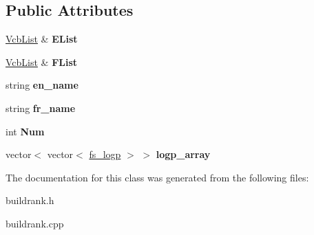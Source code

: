 \subsection*{\-Public \-Attributes}
\begin{DoxyCompactItemize}
\item 
\hypertarget{classbuildrank_ad13e26f7f5f7b4ed1b164c2c08921403}{\hyperlink{classVcbList}{\-Vcb\-List} \& {\bfseries \-E\-List}}\label{classbuildrank_ad13e26f7f5f7b4ed1b164c2c08921403}

\item 
\hypertarget{classbuildrank_a461f9d48e39c8f57f59b42af5fad9b18}{\hyperlink{classVcbList}{\-Vcb\-List} \& {\bfseries \-F\-List}}\label{classbuildrank_a461f9d48e39c8f57f59b42af5fad9b18}

\item 
\hypertarget{classbuildrank_abf696839f3da517f8a17d9548d159209}{string {\bfseries en\-\_\-name}}\label{classbuildrank_abf696839f3da517f8a17d9548d159209}

\item 
\hypertarget{classbuildrank_ab76d9383862f61205be0a955ebb19a74}{string {\bfseries fr\-\_\-name}}\label{classbuildrank_ab76d9383862f61205be0a955ebb19a74}

\item 
\hypertarget{classbuildrank_a27f719e096bb9901f086d42257438c3c}{int {\bfseries \-Num}}\label{classbuildrank_a27f719e096bb9901f086d42257438c3c}

\item 
\hypertarget{classbuildrank_a2f7b42e06435adf8a135df247c072297}{vector$<$ vector$<$ \hyperlink{classfs__logp}{fs\-\_\-logp} $>$ $>$ {\bfseries logp\-\_\-array}}\label{classbuildrank_a2f7b42e06435adf8a135df247c072297}

\end{DoxyCompactItemize}


\-The documentation for this class was generated from the following files\-:\begin{DoxyCompactItemize}
\item 
buildrank.\-h\item 
buildrank.\-cpp\end{DoxyCompactItemize}
